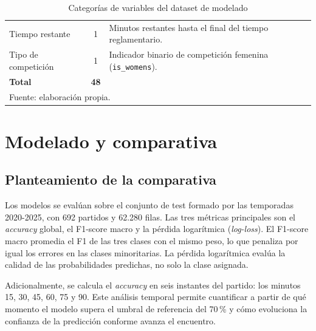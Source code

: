 \begin{table}[H]
\begin{tabular}{lcp{7.5cm}}
        Tiempo restante              & 1                  & Minutos restantes hasta el final del tiempo reglamentario.                                                                                                                                                                                               \\[4pt]
        Tipo de competición          & 1                  & Indicador binario de competición femenina (\texttt{is\_womens}).                                                                                                                                                                                         \\
        \hline
        \textbf{Total}               & \textbf{48}        &                                                                                                                                                                                                                                                          \\
        \hline
        \multicolumn{3}{l}{\small Fuente: elaboración propia.}
    \end{tabular}
    \caption{Categorías de variables del dataset de modelado}
    \label{tab:features}
\end{table}
\section{Modelado y comparativa}

\subsection{Planteamiento de la comparativa}

Los modelos se evalúan sobre el conjunto de test formado por las temporadas 2020-2025, con 692 partidos y 62.280 filas. Las tres métricas principales son el \textit{accuracy} global, el F1-score macro y la pérdida logarítmica (\textit{log-loss}). El F1-score macro promedia el F1 de las tres clases con el mismo peso, lo que penaliza por igual los errores en las clases minoritarias. La pérdida logarítmica evalúa la calidad de las probabilidades predichas, no solo la clase asignada.

Adicionalmente, se calcula el \textit{accuracy} en seis instantes del partido: los minutos 15, 30, 45, 60, 75 y 90. Este análisis temporal permite cuantificar a partir de qué momento el modelo supera el umbral de referencia del 70\,\% y cómo evoluciona la confianza de la predicción conforme avanza el encuentro.


